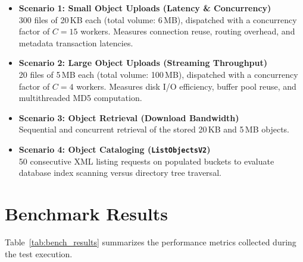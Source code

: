 \documentclass[11pt,a4paper]{article}
\begin{document}
\begin{itemize}
    \item \textbf{Scenario 1: Small Object Uploads (Latency \& Concurrency)} \\
    300 files of 20\,KB each (total volume: 6\,MB), dispatched with a concurrency factor of $C=15$ workers. Measures connection reuse, routing overhead, and metadata transaction latencies.
    \item \textbf{Scenario 2: Large Object Uploads (Streaming Throughput)} \\
    20 files of 5\,MB each (total volume: 100\,MB), dispatched with a concurrency factor of $C=4$ workers. Measures disk I/O efficiency, buffer pool reuse, and multithreaded MD5 computation.
    \item \textbf{Scenario 3: Object Retrieval (Download Bandwidth)} \\
    Sequential and concurrent retrieval of the stored 20\,KB and 5\,MB objects.
    \item \textbf{Scenario 4: Object Cataloging (\texttt{ListObjectsV2})} \\
    50 consecutive XML listing requests on populated buckets to evaluate database index scanning versus directory tree traversal.
\end{itemize}

\section{Benchmark Results}

Table~\ref{tab:bench_results} summarizes the performance metrics collected during the test execution.
\end{document}
